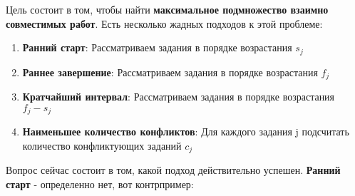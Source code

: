 Цель состоит в том, чтобы найти \textbf{максимальное подмножество взаимно совместимых работ}. Есть несколько жадных подходов к этой проблеме:

\begin{enumerate}
    \item \textbf{Ранний старт}: Рассматриваем задания в порядке возрастания { $s_j$}
    \item \textbf{Раннее завершение}: Рассматриваем задания в порядке возрастания { $f_j$}
    \item \textbf{Кратчайший интервал}: Рассматриваем задания в порядке возрастания { $f_j-s_j$}
    \item \textbf{Наименьшее количество конфликтов}: Для каждого задания { j} подсчитать количество конфликтующих заданий { $c_j$}
\end{enumerate}

\vspace{\baselineskip}

Вопрос сейчас состоит в том, какой подход действительно успешен. \textbf{Ранний старт} - определенно нет, вот контрпример:
